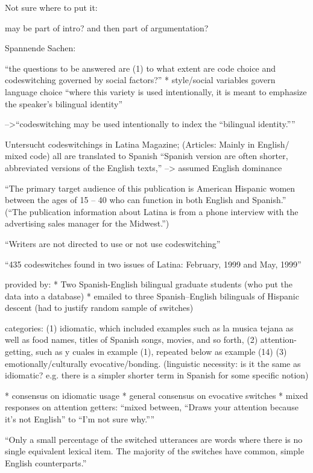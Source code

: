 Not sure where to put it:

may be part of intro?
and then part of argumentation?


Spannende Sachen:

``the questions to be answered are (1) to what extent are code choice
and codeswitching governed by social factors?''
* style/social variables govern language choice
``where this variety is used intentionally, it is meant to emphasize the speaker’s bilingual identity''

-->``codeswitching may be used intentionally to index the “bilingual identity.”''

Untersucht codeswitchings in Latina Magazine;
(Articles: Mainly in English/ mixed code)
all are translated to Spanish
``Spanish version are often shorter, abbreviated versions of
the English texts,'' --> assumed English dominance

``The primary target audience of this
publication is American Hispanic women between the ages of 15 – 40 who can function
in both English and Spanish.'' (``The publication information about Latina is from a phone interview with the advertising sales manager for the
Midwest.'')

``Writers are not directed to use or not use codeswitching''

``435 codeswitches found
in two issues of Latina: February, 1999 and May, 1999''

provided by:
* Two Spanish-English bilingual graduate students (who put the data into a database)
* emailed to three Spanish–English bilinguals of Hispanic descent (had to justify random sample of switches)

categories:
(1) idiomatic, which included examples such as la musica tejana as well as food names, titles of Spanish songs, movies,
and so forth,
(2) attention-getting, such as y cuales in example (1), repeated below as example (14)
(3) emotionally/culturally evocative/bonding.
(linguistic necessity: is it the same as idiomatic? e.g. there is a simpler shorter term in Spanish for some specific notion)

* consensus on idiomatic usage
* general consensus on evocative switches
* mixed responses on attention getters: ``mixed between, “Draws your
attention because it’s not English” to “I’m not sure why.”''

``Only a small percentage of
the switched utterances are words where there is no single equivalent lexical item. The
majority of the switches have common, simple English counterparts.''

